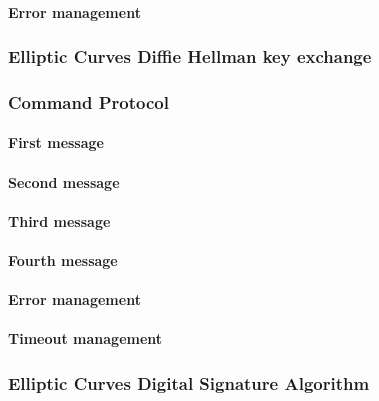 \documentclass[a4paper,12pt]{article}
\begin{document}
\paragraph{Error management}
\subsubsection{Elliptic Curves Diffie Hellman key exchange}
\subsubsection{Command Protocol}
\paragraph{First message}
\paragraph{Second message}
\paragraph{Third message}
\paragraph{Fourth message}
\paragraph{Error management}
\paragraph{Timeout management}
\subsubsection{Elliptic Curves Digital Signature Algorithm}
\end{document}
